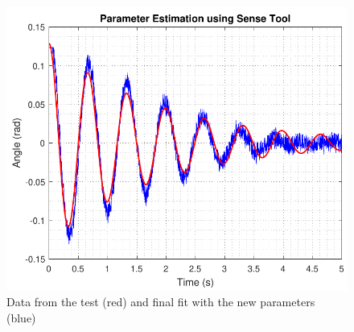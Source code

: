 \begin{figure}[H]
	\centering
	\includegraphics[scale=0.6]{figures/SenseToolParameterEstimation}
	\caption{Data from the test (red) and final fit with the new parameters (blue)}
	\label{SenseToolParameterEstimation}
\end{figure}

